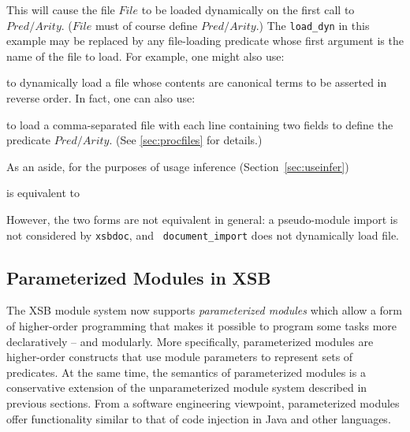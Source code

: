 
\noindent This will cause the file $File$ to be loaded dynamically on
the first call to $Pred/Arity$.  ($File$ must of course define
$Pred/Arity$.)  The {\tt load\_dyn} in this example may be replaced by
any file-loading predicate whose first argument is the name of the
file to load.  For example, one might also use:


\noindent to dynamically load a file whose contents are canonical
terms to be asserted in reverse order.  In fact, one can also use:


\noindent to load a comma-separated file with each line containing two
fields to define the predicate $Pred/Arity$.  (See \ref{sec:procfiles}
for details.)

As an aside, for the purposes of usage inference
(Section~\ref{sec:useinfer}) 


\noindent is equivalent to 

  
\noindent However, the two forms are not equivalent in general: a
pseudo-module import is not considered by {\tt xsbdoc}, and {\tt
  document\_import} does not dynamically load file.

\subsection{Parameterized Modules in XSB}

The XSB module system now supports {\em parameterized modules} which
allow a form of higher-order programming that makes it possible to
program some tasks more declaratively -- and modularly.  More
specifically, parameterized modules are higher-order constructs that
use module parameters to represent sets of predicates.  At the same
time, the semantics of parameterized modules is a conservative
extension of the unparameterized module system described in previous
sections. From a software engineering viewpoint, parameterized modules
offer functionality similar to that of code injection in Java and
other languages.

